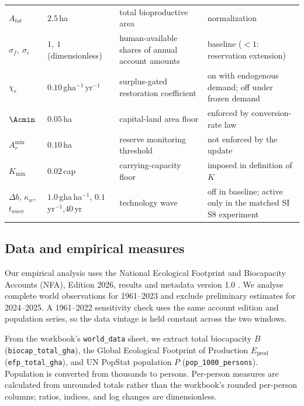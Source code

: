 \begin{table}[!htbp]
\begin{tabularx}{\textwidth}{@{}>{\raggedright\arraybackslash}p{} >{\raggedright\arraybackslash}p{} >{\raggedright\arraybackslash}X >{\raggedright\arraybackslash}p{}@{}}
$A_{tot}$ & $2.5$\,ha & total bioproductive area & normalization \\
$\sigma_f,\ \sigma_c$ & $1,\ 1$ (dimensionless) & human-available shares of annual account amounts & baseline ($<1$: reservation extension) \\
$\chi_r$ & $0.10$\,gha$^{-1}$\,yr$^{-1}$ & surplus-gated restoration coefficient & on with endogenous demand; off under frozen demand \\
$\Acmin$ & $0.05$\,ha & capital-land area floor & enforced by conversion-rate law \\
$A_r^{\min}$ & $0.10$\,ha & reserve monitoring threshold & not enforced by the update \\
$K_{\min}$ & $0.02$\,cap & carrying-capacity floor & imposed in definition of $K$ \\
$\Delta b$, $\kappa_w$,\newline $t_{wave}$ & $1.0$\,gha\,ha$^{-1}$, $0.1$\,yr$^{-1}$,\newline $40$\,yr & technology wave & off in baseline; active only in the matched SI S8 experiment \\
\bottomrule
\end{tabularx}
\end{table}

\subsection{Data and empirical measures}\label{sec:data}

Our empirical analysis uses the National Ecological Footprint and Biocapacity Accounts (NFA), Edition 2026, results and metadata version 1.0 \citep{Lo2026NFA}. We analyse complete world observations for 1961--2023 and exclude preliminary estimates for 2024--2025. A 1961--2022 sensitivity check uses the same account edition and population series, so the data vintage is held constant across the two windows.

From the workbook's \texttt{world\_data} sheet, we extract total biocapacity $B$ (\texttt{biocap\_total\_gha}), the Global Ecological Footprint of Production $E_{\mathrm{prod}}$ (\texttt{efp\_total\_gha}), and UN PopStat population $P$ (\texttt{pop\_1000\_persons}). Population is converted from thousands to persons. Per-person measures are calculated from unrounded totals rather than the workbook's rounded per-person columns; ratios, indices, and log changes are dimensionless.

